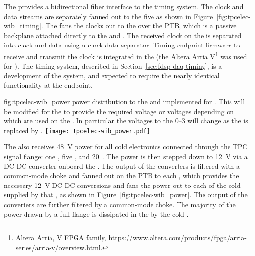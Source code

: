 The   provides a bidirectional fiber interface to the
timing system. The clock and data
streams are separately fanned out to the five  as shown in
Figure~\ref{fig:tpcelec-wib_timing}. The  fans the clocks out to the  over the
PTB, which is a passive backplane attached directly to the  and
.  The received clock on the  is separated into clock and
data using a clock-data separator. Timing endpoint firmware to receive and transmit
the clock is integrated in the   (the Altera Arria V\footnote{Altera Arria\texttrademark{}, V FPGA family, \url{https://www.altera.com/products/fpga/arria-series/arria-v/overview.html}.} was used for ).
The  timing system, described in Section~\ref{sec:fdsp-daq-timing}, is a development of the  system, and expected to require the nearly identical functionality at the  endpoint.

\begin{dunefigure}
{fig:tpcelec-wib_power}
{ power distribution to the  and  implemented for . This will be modified for the  to provide the required voltage or voltages depending on which  are used on the . In particular the voltages to the  \numrange{0}{3} will change as the   is replaced by . }
\texttt{[image: tpcelec-wib\_power.pdf]}
\end{dunefigure}


The  also receives \SI{48}{V}  power for all cold
electronics connected through the TPC signal flange: one , five , and \num{20}~. The  power is then stepped down
to \SI{12}{V} via a DC-DC converter onboard the . The output of the  converters is filtered with a common-mode choke and fanned out
on the PTB to each , which provides the necessary \SI{12}{V} DC-DC conversions and fans
the  power out to each of the cold  supplied by that , 
as shown in Figure~\ref{fig:tpcelec-wib_power}. The output of the  converters are further filtered by a common-mode choke. The 
majority of the power drawn by a full flange is dissipated in the \lar by the cold .


